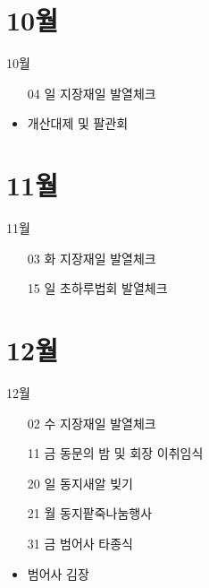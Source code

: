 \documentclass[aspectratio=1610,17pt,xcolor=pdftex,dvipsnames,table,handout]{beamer}
\begin{document}
		\section{10월  }
		

		\begin{frame} [t,plain]
			\begin{block} {10월 }
			\begin{itemize}
					\item [04] 일	지장재일 발열체크
					\item 	개산대제 및 팔관회
			\end{itemize}
			\end{block}
		\end{frame}
		

		\section{11월  }
		

		\begin{frame} [t,plain]
			\begin{block} {11월 }
			\begin{itemize}
					\item [03] 화 	지장재일 발열체크
					\item [15] 일 	초하루법회 발열체크
			\end{itemize}
			\end{block}
		\end{frame}
		
		\section{12월  }
		

		\begin{frame} [t,plain]
			\begin{block} {12월 }
			\begin{itemize}
					\item [02] 수		지장재일 발열체크
					\item [11] 금		동문의 밤 및 회장 이취임식 
					\item [20] 일		동지새알 빚기
					\item [21] 월		동지팥죽나눔행사
					\item [31] 금		범어사 타종식
					\item 범어사 김장
			\end{itemize}
			\end{block}
		\end{frame}
\end{document}
